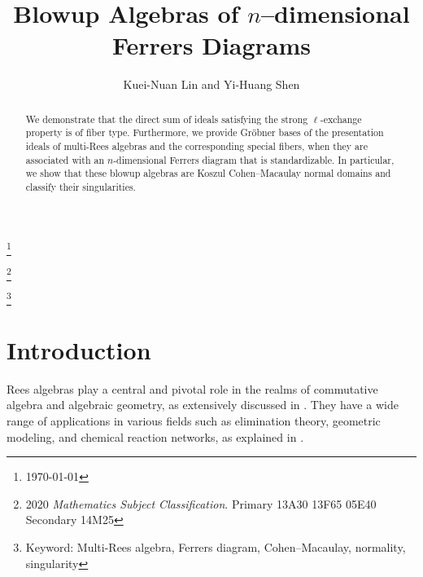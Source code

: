 \documentclass[11pt,a4paper,reqno,dvipsnames]{amsart}
\theoremstyle{plain}
\theoremstyle{definition}
\newtheorem{Assumptions and Discussion}[Theorem]{Assumptions and Discussion}
\theoremstyle{remark}
\begin{document}
\title{Blowup Algebras of $n$--dimensional Ferrers Diagrams}

\author[Kuei-Nuan Lin, Yi-Huang Shen]{Kuei-Nuan Lin and Yi-Huang Shen}

\thanks{\today}

\thanks{2020 {\em Mathematics Subject Classification}.
    Primary 
    13A30 %
    13F65  	%
    05E40 %
    Secondary 14M25  	%
}

\thanks{Keyword: Multi-Rees algebra, Ferrers diagram, Cohen--Macaulay, normality, singularity}

\address{Department of Mathematics, The Penn State University, McKeesport, PA,
15132, USA}

\address{School of Mathematical Sciences, University of Science and Technology of China, Hefei, Anhui, 230026, P.R.~China}

\begin{abstract}
    We demonstrate that the direct sum of ideals satisfying the strong $\ell$-exchange property is of fiber type.  Furthermore, we provide Gr\"obner bases of the presentation ideals of multi-Rees algebras and the corresponding special fibers, when they are associated with an $n$-dimensional Ferrers diagram that is standardizable. In particular, we show that these blowup algebras are
    Koszul Cohen--Macaulay normal domains and classify their singularities.
\end{abstract}

\maketitle



\section{Introduction}

Rees algebras play a central and pivotal role in the realms of commutative algebra and algebraic geometry, as extensively discussed in \cite{vasconcelos1994arithmetic}. They have a wide range of applications in various fields such as elimination theory, geometric modeling, and chemical reaction networks, as explained in \cites{CWL, Cox, CLS}.
\end{document}
